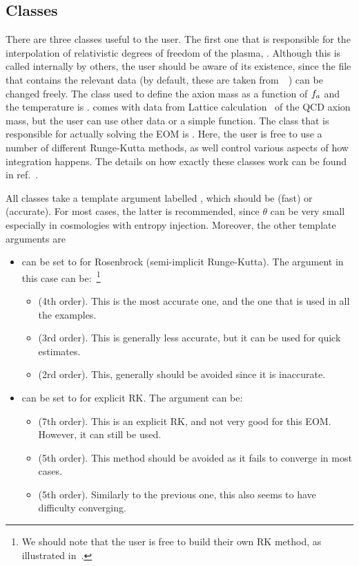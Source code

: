 \documentclass[a4paper,11pt]{article}
\begin{document}
	\subsection{Classes}
	There are three classes useful to the user. The first one that is responsible for the interpolation of relativistic degrees of freedom of the plasma, .
	Although this is called internally  by others, the user should be aware of its existence, since the file that contains the relevant data (by default, these are taken from~~\cite{Saikawa:2020swg})  can be changed freely. The class used to define the axion mass as a function of $f_{a}{}$ and the temperature is .  
	\mimes comes with data from Lattice calculation~\cite{Borsanyi:2016ksw} of the QCD axion mass, but the user can use other data or a simple function.
	The class that is responsible for actually solving the EOM is . Here, the user is free to use a number of different Runge-Kutta methods,
	as well control various aspects of how integration happens. The details on how exactly these classes work can be found in ref.~\cite{Karamitros:2021nxi}.
	
	All classes take a template argument labelled , which should be  (fast) or  (accurate). For most cases, the latter is
	recommended, since $\theta$ can be very small especially in cosmologies with entropy injection. Moreover, the other template arguments are
	\begin{itemize}
		\item {} can be set to  for Rosenbrock (semi-implicit Runge-Kutta). 
		The  argument in this case can be:~\footnote{We should note that the user is free to build their own RK method, as illustrated in~\cite{Karamitros:2021nxi}.}
		\begin{itemize}
			\item {} (4th order). This is the most accurate one, and the one that is used in all the examples.
			\item {} (3rd order). This is generally less accurate, but it can be used for quick estimates.
			\item {} (2rd order). This, generally should be avoided since it is inaccurate.
		\end{itemize}
		\item {} can be set to  for explicit RK.
		The  argument can be:
		\begin{itemize}
			\item {} (7th order). This is an explicit RK, and not very good for this EOM. However, it can still be used.
			\item {} (5th order). This method should be avoided as it fails to converge in most cases.
			\item {} (5th order). Similarly to the previous one, this also seems to have difficulty converging.
		\end{itemize}	
	\end{itemize}
	
\end{document}
